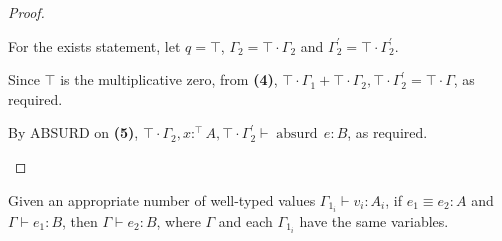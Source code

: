 \documentclass[acmsmall,screen,nonacm]{acmart}
\DeclareMathOperator{\absurd}{\text{absurd}}
\newcommand{\tee}{\vdash}
\begin{document}
\begin{proof}
\begin{description}
    For the exists statement, let $q = \top$, $\Gamma_2 = \top \cdot \Gamma_2$ and $\Gamma_2^\prime = \top \cdot \Gamma_2^\prime$.

    Since $\top$ is the multiplicative zero, from \textbf{(4)}, $\top \cdot \Gamma_1 + \top \cdot \Gamma_2, \top \cdot \Gamma_2^\prime = \top \cdot \Gamma$, as required.

    By ABSURD on \textbf{(5)}, $\top \cdot \Gamma_2, x :^\top A, \top \cdot \Gamma_2^\prime \tee \absurd \, e : B$, as required.
  \end{description}
\end{proof}

\begin{theorem}
\label{lem:graded-modal-type-preservation-beta-expansion-laws}
  Given an appropriate number of well-typed values $\Gamma_{1_i} \tee v_i : A_i$, if\/ $e_1 \equiv e_2 : A$ and $\Gamma \tee e_1 : B$, then $\Gamma \tee e_2 : B$, where $\Gamma$ and each $\Gamma_{1_i}$ have the same variables.
\end{theorem}
\end{document}
